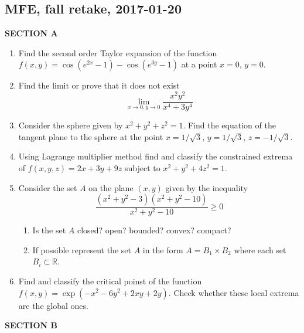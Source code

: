 \subsection{MFE, fall retake, 2017-01-20}


\textbf{SECTION A}

\begin{enumerate}


\item Find the second order Taylor expansion of the function $f(x, y) = \cos( e^{2x} - 1) - \cos(e^{3y}-1)$ at a point $x = 0$, $y=0$.


\item Find the limit or prove that it does not exist
\[
\lim_{x \to 0, y \to 0} \frac{x^2 y^2}{x^4 + 3y^4}
\]


\item Consider the sphere given by $x^2 + y^2 + z^2 = 1$. Find the equation of the tangent plane to the sphere at the point $x=1/\sqrt{3}$, $y=1/\sqrt{3}$, $z=-1/\sqrt{3}$.

\item Using Lagrange multiplier method find and classify the constrained extrema of $f(x, y, z) =  2x +3y + 9z$ subject to $x^2 + y^2 + 4z^2 = 1$.


\item Consider the set $A$ on the plane $(x, y)$ given by the inequality
\[
\frac{(x^2 + y^2 - 3)(x^2 + y^2 -10)}{x^2 + y^2 - 10} \geq 0
\]
\begin{enumerate}
  \item Is the set $A$ closed? open? bounded? convex? compact?
  \item If possible represent the set $A$ in the form $A=B_1 \times B_2$ where each set $B_i \subset \mathbb{R}$.
\end{enumerate}


\item Find and classify the critical poinst of the function $f(x, y) =  \exp(-x^2 -6y^2 + 2xy + 2y)$. Check whether these local extrema are the global ones.





\end{enumerate}

\textbf{SECTION B}

